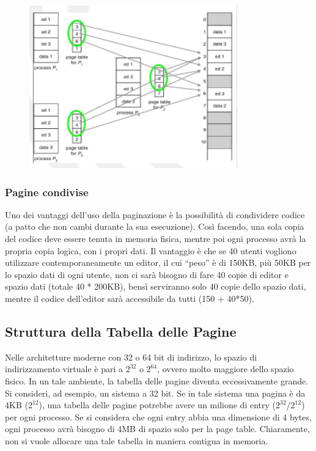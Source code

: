 \documentclass[a4paper]{article}
\begin{document}
\begin{figure}
   \includegraphics[width=9cm]{img/pag_cond.JPG}
\end{figure}
\subsubsection{Pagine condivise}
Uno dei vantaggi dell'uso della paginazione è la possibilità di condividere codice (a patto che non cambi durante la sua esecuzione). Così facendo, una sola copia del codice deve essere tenuta in memoria fisica, mentre poi ogni processo avrà la propria copia logica, con i propri dati. Il vantaggio è che se 40 utenti vogliono utilizzare contemporaneamente un editor, il cui ``peso'' è di 150KB, più 50KB per lo spazio dati di ogni utente, non ci sarà bisogno di fare 40 copie di editor e spazio dati (totale 40 * 200KB), bensì serviranno solo 40 copie dello spazio dati, mentre il codice dell'editor sarà accessibile da tutti (150 + 40*50).

\subsection{Struttura della Tabella delle Pagine}
Nelle architetture moderne con 32 o 64 bit di indirizzo, lo spazio di indirizzamento virtuale è pari a $2^32$ o $2^64$, ovvero molto maggiore dello spazio fisico. In un tale ambiente, la tabella delle pagine diventa eccessivamente grande. Si consideri, ad esempio, un sistema a 32 bit. Se in tale sistema una pagina è da 4KB ($2^12$), una tabella delle pagine potrebbe avere un milione di entry ($2^32 / 2^12$) per ogni processo. Se si considera che ogni entry abbia una dimensione di 4 bytes, ogni processo avrà bisogno di 4MB di spazio solo per la page table. Chiaramente, non si vuole allocare una tale tabella in maniera contigua in memoria.
\end{document}
